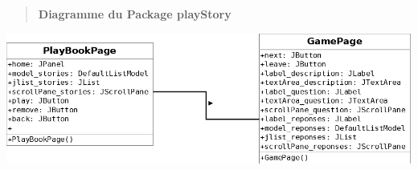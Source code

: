 \documentclass[12pt]{article}
\begin{document}
	    \begin{center}
		\begin{verse}
		    \begin{center}
		       \textbf{Diagramme du Package playStory} 
		    \end{center}
		\end{verse} 
			\newcommand{\umlscale}{0.4}
			\includegraphics[scale=\umlscale]{./images/packagePlayStory.png}
		\end{center}
	
\end{document}
